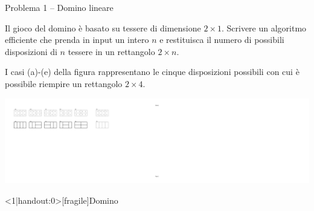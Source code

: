 \begin{frame}{Problema 1 -- Domino lineare}

\vspace{-9pt}
\begin{myboxtitle}[Definizione]
Il gioco del domino è basato su tessere di dimensione $2 \times 1$. Scrivere
un algoritmo efficiente che prenda in input un intero $n$ e restituisca il numero di possibili disposizioni di $n$ tessere in un rettangolo $2 \times n$.
\end{myboxtitle}

\begin{myboxtitle}[Esempio]
I casi (a)-(e) della figura rappresentano le cinque disposizioni possibili con cui è possibile riempire un rettangolo $2 \times 4$. 
\end{myboxtitle}

\begin{center}
\includegraphics[width=1.0\textwidth]{domino.pdf}
\end{center}

\end{frame}


\begin{frame}<1|handout:0>[fragile]{Domino}

\vspace{-9pt}

\end{frame}

